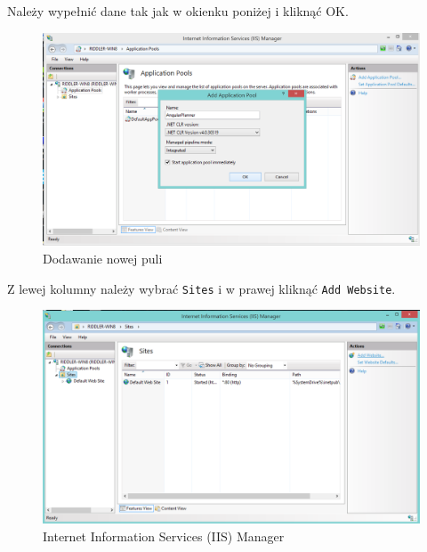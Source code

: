 \documentclass[10pt,titlepage]{article}
\begin{document}
\par Należy wypełnić dane tak jak w okienku poniżej i kliknąć OK.
\begin{figure}[H]
  \centering
  \includegraphics[scale=0.35]{images/install6.png}
  \caption{Dodawanie nowej puli}
\end{figure}
\par Z lewej kolumny należy wybrać \verb|Sites| i w prawej kliknąć \verb|Add Website|.
\begin{figure}[H]
  \centering
  \includegraphics[scale=0.35]{images/install7.png}
  \caption{Internet Information Services (IIS) Manager}
\end{figure}
\end{document}
